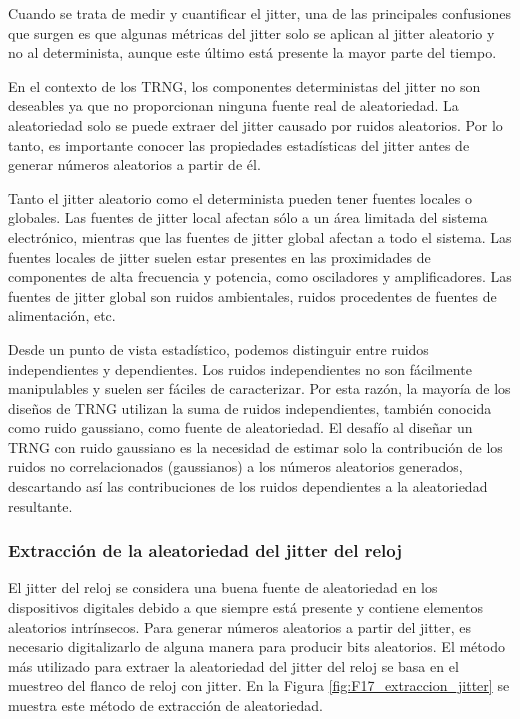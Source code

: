                 Cuando se trata de medir y cuantificar el jitter, una de las principales confusiones que surgen es que algunas métricas del jitter solo se aplican al jitter aleatorio y no al determinista, aunque este último está presente la mayor parte del tiempo.

                En el contexto de los TRNG, los componentes deterministas del jitter no son deseables ya que no proporcionan ninguna fuente real de aleatoriedad. La aleatoriedad solo se puede extraer del jitter causado por ruidos aleatorios. Por lo tanto, es importante conocer las propiedades estadísticas del jitter antes de generar números aleatorios a partir de él.

                Tanto el jitter aleatorio como el determinista pueden tener fuentes locales o globales. Las fuentes de jitter local afectan sólo a un área limitada del sistema electrónico, mientras que las fuentes de jitter global afectan a todo el sistema. Las fuentes locales de jitter suelen estar presentes en las proximidades de componentes de alta frecuencia y potencia, como osciladores y amplificadores. Las fuentes de jitter global son ruidos ambientales, ruidos procedentes de fuentes de alimentación, etc. 

                Desde un punto de vista estadístico, podemos distinguir entre ruidos independientes y dependientes. Los ruidos independientes no son fácilmente manipulables y suelen ser fáciles de caracterizar. Por esta razón, la mayoría de los diseños de TRNG utilizan la suma de ruidos independientes, también conocida como ruido gaussiano, como fuente de aleatoriedad. El desafío al diseñar un TRNG con ruido gaussiano es la necesidad de estimar solo la contribución de los ruidos no correlacionados (gaussianos) a los números aleatorios generados, descartando así las contribuciones de los ruidos dependientes a la aleatoriedad resultante.

            \subsubsection{Extracción de la aleatoriedad del jitter del reloj}

                El jitter del reloj se considera una buena fuente de aleatoriedad en los dispositivos digitales debido a que siempre está presente y contiene elementos aleatorios intrínsecos. Para generar números aleatorios a partir del jitter, es necesario digitalizarlo de alguna manera para producir bits aleatorios. El método más utilizado para extraer la aleatoriedad del jitter del reloj se basa en el muestreo del flanco de reloj con jitter. En la Figura \ref{fig:F17_extraccion_jitter} se muestra este método de extracción de aleatoriedad.

